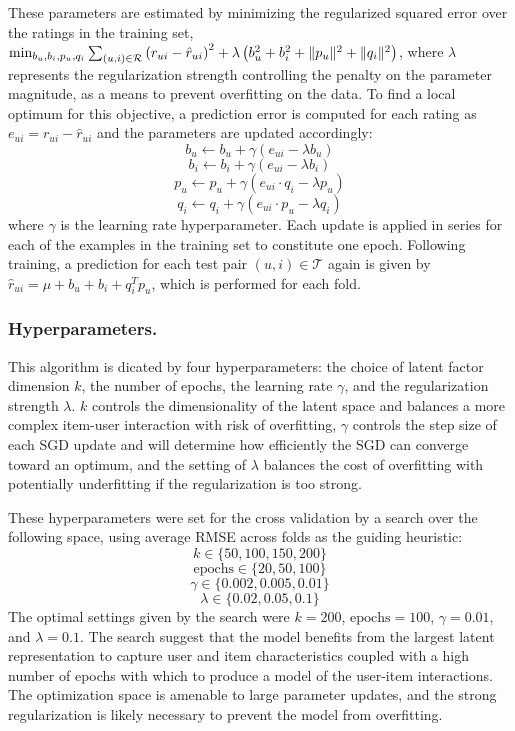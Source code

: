 These parameters are estimated by minimizing the regularized squared error over the ratings in the training set, 
$ \min_{b_u, b_i, p_u, q_i} \sum_{(u,i) \in \mathcal{R}} \left(r_{ui} - \hat{r}_{ui}\right)^2 + \\ \lambda\left(b_u^2 + b_i^2 + \|p_u\|^2 + \|q_i\|^2\right) $, 
where $ \lambda $ represents the regularization strength controlling the penalty on the parameter magnitude, as a means to prevent overfitting on the data. 
To find a local optimum for this objective, a prediction error is computed for each rating as $ e_{ui} = r_{ui} - \hat{r}_{ui} $ and the parameters are updated accordingly:
$$ b_u \leftarrow b_u + \gamma \left(e_{ui} - \lambda b_u\right) $$
$$ b_i \leftarrow b_i + \gamma \left(e_{ui} - \lambda b_i\right) $$
$$ p_u \leftarrow p_u + \gamma \left(e_{ui} \cdot q_i - \lambda p_u\right) $$
$$ q_i \leftarrow q_i + \gamma \left(e_{ui} \cdot p_u - \lambda q_i\right) $$
where $ \gamma $ is the learning rate hyperparameter. Each update is applied in series for each of the examples in the training set to 
constitute one epoch. Following training, a prediction for each test pair $ (u, i) \in \mathcal{T} $ again is given by 
$ \hat{r}_{ui} = \mu + b_u + b_i + q_i^T p_u $, which is performed for each fold.

\subsubsection{Hyperparameters.}

This algorithm is dicated by four hyperparameters: the choice of latent factor dimension $ k $, the number of epochs, the learning rate $ \gamma $, and the regularization 
strength $ \lambda $. $ k $ controls the dimensionality of the latent space and balances a more complex item-user interaction with risk of overfitting, 
$ \gamma $ controls the step size of each SGD update and will determine how efficiently the SGD can converge toward an optimum, and the setting 
of $ \lambda $ balances the cost of overfitting with potentially underfitting if the regularization is too strong.

These hyperparameters were set for the cross validation by a search over the following space, using average RMSE across folds as the guiding heuristic:
$$ k \in \{50, 100, 150, 200\} $$
$$ \text{epochs} \in \{20, 50, 100\} $$
$$ \gamma \in \{0.002, 0.005, 0.01\} $$
$$ \lambda \in \{0.02, 0.05, 0.1\} $$
The optimal settings given by the search were $k = 200$, $\text{epochs} = 100$, $\gamma = 0.01$, and $\lambda = 0.1$. The 
search suggest that the model benefits from the largest latent representation to capture user and item characteristics coupled with a high 
number of epochs with which to produce a model of the user-item interactions. The optimization space is amenable to large parameter 
updates, and the strong regularization is likely necessary to 
prevent the model from overfitting.


